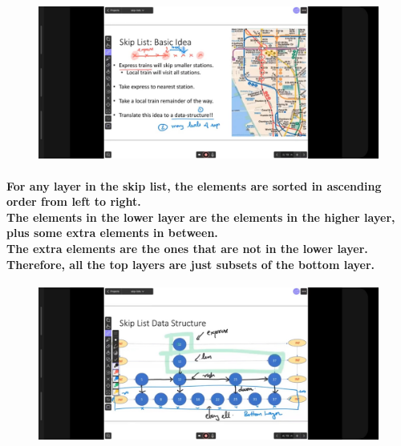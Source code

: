 \documentclass{article}
\begin{document}
\begin{figure}[H]
    \includegraphics[width=\textwidth]{skiplistmapexample.jpg}
\end{figure}


\paragraph{
    For any layer in the skip list, the elements are sorted in ascending order from left to right.\\
    The elements in the lower layer are the elements in the higher layer, plus some extra elements in between.\\
    The extra elements are the ones that are not in the lower layer. Therefore, all the top layers are just subsets of the bottom layer.\\
}

\begin{figure}[H]
    \includegraphics[width=\textwidth]{skiplistdatastructure.jpg}
\end{figure}
\end{document}
